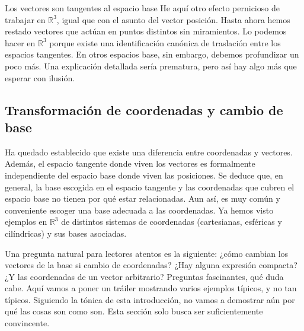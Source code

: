 \begin{observation}{Los vectores son tangentes al espacio base}
    He aquí otro efecto pernicioso de trabajar en \(\mathbb{R}^3\), igual que con el asunto del vector posición. Hasta ahora hemos restado vectores que actúan en puntos distintos sin miramientos. Lo podemos hacer en \(\mathbb{R}^3\) porque existe una identificación canónica de traslación entre los espacios tangentes. En otros espacios base, sin embargo, debemos profundizar un poco más. Una explicación detallada sería prematura, pero así hay algo más que esperar con ilusión.
    
\end{observation}

\subsection{Transformación de coordenadas y cambio de base}
\label{subsec.1transformaciones}

Ha quedado establecido que existe una diferencia entre coordenadas y vectores. Además, el espacio tangente donde viven los vectores es formalmente independiente del espacio base donde viven las posiciones. Se deduce que, en general, la base escogida en el espacio tangente y las coordenadas que cubren el espacio base no tienen por qué estar relacionadas. Aun así, es muy común y conveniente escoger una base adecuada a las coordenadas. Ya hemos visto ejemplos en \(\mathbb{R}^3\) de distintos sistemas de coordenadas (cartesianas, esféricas y cilíndricas) y sus bases asociadas.

Una pregunta natural para lectores atentos es la siguiente: ¿cómo cambian los vectores de la base si cambio de coordenadas? ¿Hay alguna expresión compacta? ¿Y las coordenadas de un vector arbitrario? Preguntas fascinantes, qué duda cabe. Aquí vamos a poner un tráiler mostrando varios ejemplos típicos, y no tan típicos. Siguiendo la tónica de esta introducción, no vamos a demostrar aún por qué las cosas son como son. Esta sección solo busca ser suficientemente convincente.


